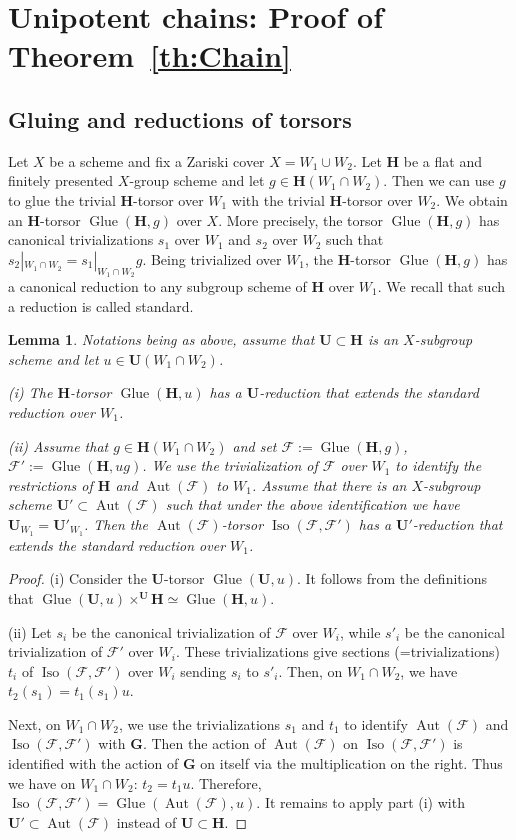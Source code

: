 \documentclass[11pt]{amsart}
\DeclareMathOperator\Glue{{Glue}}
\DeclareMathOperator{\Aut}{Aut}
\DeclareMathOperator{\Iso}{Iso}
\theoremstyle{plain}
\newtheorem{lemma}[proposition]{Lemma}
\theoremstyle{definition}
\theoremstyle{remark}
\newcommand\cF{{\mathcal{F}}}
\newcommand\bG{{\mathbf G}}
\newcommand\bH{{\mathbf H}}
\newcommand\bU{{\mathbf U}}
\begin{document}
\section{Unipotent chains: Proof of Theorem~\ref{th:Chain}}\label{sect:ProofOfChain}

\subsection{Gluing and reductions of torsors}\label{sect:Gluing}
Let $X$ be a scheme and fix a Zariski cover $X=W_1\cup W_2$. Let $\bH$ be a flat and finitely presented $X$-group scheme and let $g\in\bH(W_1\cap W_2)$. Then we can use $g$ to glue the trivial $\bH$-torsor over $W_1$ with the trivial $\bH$-torsor over $W_2$. We obtain an $\bH$-torsor $\Glue(\bH,g)$ over $X$. More precisely, the torsor $\Glue(\bH,g)$ has canonical trivializations $s_1$ over $W_1$ and $s_2$ over $W_2$ such that $s_2|_{W_1\cap W_2}=s_1|_{W_1\cap W_2}g$. Being trivialized over $W_1$, the $\bH$-torsor $\Glue(\bH,g)$ has a canonical reduction to any subgroup scheme of $\bH$ over $W_1$. We recall that such a reduction is called standard.

\begin{lemma}\label{lm:GlueRed}
  Notations being as above, assume that $\bU\subset\bH$ is an $X$-subgroup scheme and let $u\in\bU(W_1\cap W_2)$.

  (i) The $\bH$-torsor $\Glue(\bH,u)$ has a $\bU$-reduction that extends the standard reduction over $W_1$.

  (ii) Assume that $g\in\bH(W_1\cap W_2)$ and set $\cF:=\Glue(\bH,g)$, $\cF':=\Glue(\bH,ug)$. We use the trivialization of $\cF$ over $W_1$ to identify the restrictions of $\bH$ and $\Aut(\cF)$ to $W_1$. Assume that there is an $X$-subgroup scheme $\bU'\subset\Aut(\cF)$ such that under the above identification we have $\bU_{W_1}=\bU'_{W_1}$. Then the $\Aut(\cF)$-torsor $\Iso(\cF,\cF')$ has a $\bU'$-reduction that extends the standard reduction over $W_1$.
\end{lemma}
\begin{proof}
  (i) Consider the $\bU$-torsor $\Glue(\bU,u)$. It follows from the definitions that $\Glue(\bU,u)\times^\bU\bH\simeq\Glue(\bH,u)$.

  (ii) Let $s_i$ be the canonical trivialization of $\cF$ over $W_i$, while $s'_i$ be the canonical trivialization of $\cF'$ over $W_i$. These trivializations give sections (=trivializations) $t_i$ of $\Iso(\cF,\cF')$ over $W_i$ sending $s_i$ to $s'_i$. Then, on $W_1\cap W_2$, we have $t_2(s_1)=t_1(s_1)u$.

  Next, on $W_1\cap W_2$, we use the trivializations $s_1$ and $t_1$ to identify $\Aut(\cF)$ and $\Iso(\cF,\cF')$ with $\bG$. Then the action of $\Aut(\cF)$ on $\Iso(\cF,\cF')$ is identified with the action of $\bG$ on itself via the multiplication on the right. Thus we have on $W_1\cap W_2$: $t_2=t_1u$. Therefore, $\Iso(\cF,\cF')=\Glue(\Aut(\cF),u)$. It remains to apply part (i) with $\bU'\subset\Aut(\cF)$ instead of $\bU\subset\bH$.
\end{proof}
\end{document}
